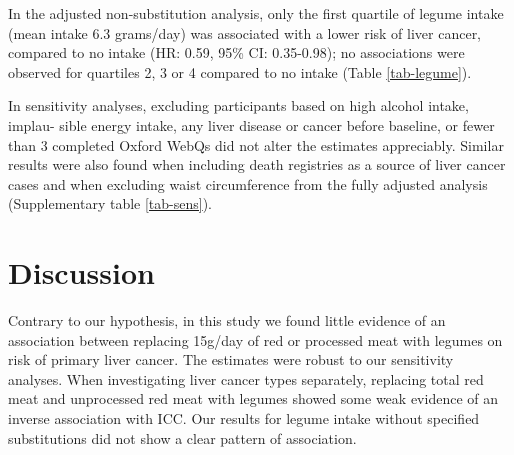 \documentclass[sn-basic,Numbered,iicol,pdflatex]{sn-jnl}
\begin{document}
In the adjusted non-substitution analysis, only the first quartile of
legume intake (mean intake 6.3 grams/day) was associated with a lower
risk of liver cancer, compared to no intake
(HR: 0.59, 95\% CI: 0.35-0.98);
no associations were observed for quartiles 2, 3 or 4 compared to no
intake (Table \ref{tab-legume}).

In sensitivity analyses, excluding participants based on high alcohol
intake, implau- sible energy intake, any liver disease or cancer before
baseline, or fewer than 3 completed Oxford WebQs did not alter the
estimates appreciably. Similar results were also found when including
death registries as a source of liver cancer cases and when excluding
waist circumference from the fully adjusted analysis (Supplementary
table \ref{tab-sens}).

\hypertarget{sec4}{%
\section{Discussion}\label{sec4}}

Contrary to our hypothesis, in this study we found little evidence of an
association between replacing 15g/day of red or processed meat with
legumes on risk of primary liver cancer. The estimates were robust to
our sensitivity analyses. When investigating liver cancer types
separately, replacing total red meat and unprocessed red meat with
legumes showed some weak evidence of an inverse association with ICC.
Our results for legume intake without specified substitutions did not
show a clear pattern of association.
\end{document}
